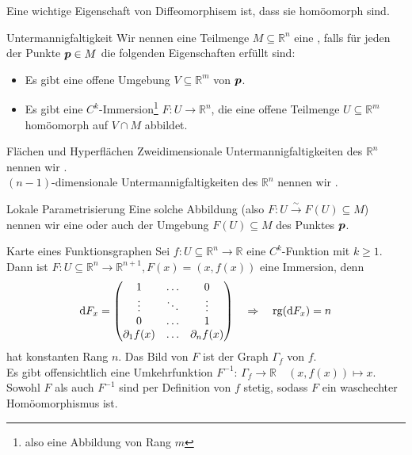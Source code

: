 Eine wichtige Eigenschaft von Diffeomorphisem ist, dass sie homöomorph sind.
\begin{Def}
{Untermannigfaltigkeit}
Wir nennen eine Teilmenge $M\subseteq\mathbb{R}^n$ eine , falls für jeden der Punkte ${{\text{\boldmath${p}$}}}\in M$ die folgenden Eigenschaften erfüllt sind:
\begin{itemize}
    \item Es gibt eine offene Umgebung $V\subseteq\mathbb{R}^m$ von ${{\text{\boldmath${p}$}}}$.
    \item Es gibt eine $C^k$-Immersion\footnote{also eine Abbildung von Rang $m$} $F:U\to\mathbb{R}^n$, die eine offene Teilmenge $U\subseteq\mathbb{R}^m$ homöomorph auf $V\cap M$ abbildet.
\end{itemize}
\end{Def}
\begin{Def}
{Flächen und Hyperflächen}
Zweidimensionale Untermannigfaltigkeiten des $\mathbb{R}^n$ nennen wir .\\
$(n-1)$-dimensionale Untermannigfaltigkeiten des $\mathbb{R}^n$ nennen wir .
\end{Def}
\begin{Def}
{Lokale Parametrisierung}
Eine solche Abbildung (also $F:U\overset{\sim}{\to}F(U)\subseteq M$) nennen wir eine  oder auch  der Umgebung $F(U)\subseteq M$ des Punktes ${{\text{\boldmath${p}$}}}$.
\end{Def}
\begin{Beispiel}
    {Karte eines Funktionsgraphen}
    Sei $f: U\subseteq\mathbb{R}^n\rightarrow\mathbb{R}$ eine $C^k$-Funktion mit $k\geq 1$. Dann ist $F:U\subseteq\mathbb{R}^n\rightarrow\mathbb{R}^{n+1}, F(x)=(x,f(x))$ eine Immersion, denn
    \begin{equation*}
        \text{d}F_x=\begin{pmatrix}1 & \ldots & 0 \\ \vdots & \ddots & \vdots \\ 0 & \ldots & 1 \\ \partial_1 f(x) & \ldots & \partial_n f(x)\end{pmatrix} \quad \Rightarrow \quad \text{rg}(\text{d}F_x) = n
    \end{equation*}
    hat konstanten Rang $n$. Das Bild von $F$ ist der Graph $\Gamma_f$ von $f$. \\
    Es gibt offensichtlich eine Umkehrfunktion $F^{-1}:\,\Gamma_f\rightarrow\mathbb{R}\quad(x,f(x))\mapsto x$. Sowohl $F$ als auch $F^{-1}$ sind per Definition von $f$ stetig, sodass $F$ ein waschechter Homöomorphismus ist.
\end{Beispiel}
